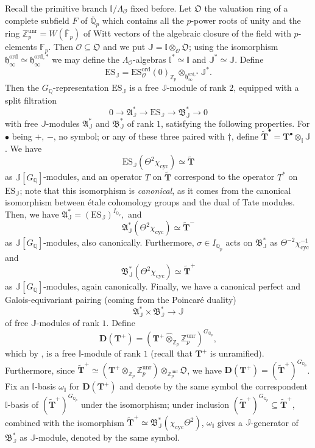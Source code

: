 \documentclass[a4paper,11pt]{amsart}
\numberwithin{equation}{section}
\theoremstyle{plain}
\theoremstyle{definition}
\theoremstyle{remark}
\newcommand{\Q}{\mathbb Q}
\newcommand{\Z}{\mathbb Z}
\newcommand{\F}{\mathbb F}
\newcommand{\I}{\mathbb{I}}
\newcommand{\J}{\mathbb{J}}
\newcommand{\cyc}{{\mathrm{cyc}}}
\newcommand{\ord}{\mathrm{ord}}
\newcommand{\unr}{\mathrm{unr}}
\newcommand{\ES}{\mathrm{ES}}
\begin{document}
Recall the primitive branch $\I/\Lambda_\mathcal{O}$ fixed before. Let $\mathfrak{O}$ the valuation ring of a complete subfield $F$ of $\overline{\Q}_p$ which contains all the $p$-power roots of unity and the ring $\Z_p^\unr=W(\overline{\F}_p)$ of Witt vectors of the algebraic closure of the field with $p$-elements $\F_p$. Then $\mathcal{O}\subseteq\mathfrak{O}$ and we put 
$\mathbb{J}=\mathbb{I}\otimes_{\mathcal{O}}\mathfrak{O}$; 
using the isomorphism $\mathfrak{h}_\infty^\ord\simeq\mathfrak{h}_\infty^{\ord,*}$ we may define the $\Lambda_\mathcal{O}$-algebras $\I^*\simeq\I$ and $\J^*\simeq\J$.  
Define \[\ES_\J=\ES^\ord_{\mathcal{O}}(0)_{\Z_p}\otimes_{\mathfrak{h}_\infty^{\ord,*}}\mathbb{J}^*.\] Then the $G_\Q$-representation $\ES_\J$ is a free $\J$-module of rank $2$, equipped with a split filtration 
\[0\longrightarrow \mathfrak{A}_\J^*\longrightarrow\ES_\J\longrightarrow \mathfrak{B}_\J^*\longrightarrow 0\]
with free $\J$-modules $\mathfrak{A}_\J^*$ and $\mathfrak{B}_\J^*$ of rank $1$, satisfying the following properties. For $\bullet$ being $+$, $-$, no symbol; or any of these three paired with $\dagger$,
define $\widetilde{\mathbf{T}}^\bullet=\mathbf{T}^\bullet\otimes_\I\J$. We have 
\[\ES_\J(\Theta^2\chi_\cyc)\simeq\widetilde{\mathbf{T}}\] as $\J[G_\Q]$-modules,
and an operator $T$ on $\widetilde{\mathbf{T}}$ correspond to the operator $T^*$ on $\ES_\J$; note that this isomorphism is \emph{canonical}, as it 
comes from the canonical isomorphism between \'etale cohomology groups and the dual of Tate modules. 
Then, we have 
$\mathfrak{A}_\J^*=(\ES_\J)^{I_{\Q_p}},$ and  
\[\mathfrak{A}_\J^*(\Theta^2\chi_\cyc)\simeq \widetilde{\mathbf{T}}^-\] 
as $\J[G_\Q]$-modules, also canonically. 
Furthermore, $\sigma\in I_{\Q_p}$ acts on $\mathfrak{B}_{\J}^{*}$ as $\Theta^{-2}\chi_\cyc^{-1}$ and  
\[\mathfrak{B}_\J^*(\Theta^2\chi_\cyc)\simeq  \widetilde{\mathbf{T}}^+\] as $\J[G_\Q]$-modules, again canonically. Finally, we have a canonical perfect and Galois-equivariant pairing (coming from the Poincaré duality) 
\[\mathfrak{A}^*_\J\times \mathfrak{B}_\J^*\longrightarrow \J\]
of free $\J$-modules of rank $1$. Define \[\mathbf{D}(\mathbf{T}^+)=(\mathbf{T}^+\widehat{\otimes}_{\Z_p}\Z_p^\unr)^{G_{\Q_p}},\] which 
by \cite[Lemma 3.3]{Ochiai-Coleman}, is a free $\I$-module of rank $1$ (recall that $\mathbf{T}^+$ is unramified). Furthermore, since $\widetilde{\mathbf{T}}^+\simeq (\mathbf{T}^+\otimes_{\Z_p}\Z_p^\unr)\otimes_{\Z_p^\unr}\mathfrak{O}$, we have $\mathbf{D}(\mathbf{T}^+)=(\widetilde{\mathbf{T}}^+)^{G_{\Q_p}}$. Fix an $\I$-basis $\omega_\I$ for $\mathbf{D}(\mathbf{T}^+)$ and denote by the same symbol the correspondent $\I$-basis of $(\widetilde{\mathbf{T}}^+)^{G_{\Q_p}}$ under the isomorphism; under inclusion $(\widetilde{\mathbf{T}}^+)^{G_{\Q_p}}\subseteq \widetilde{\mathbf{T}}^+$, combined with the isomorphism $\widetilde{\mathbf{T}}^+\simeq\mathfrak{B}_\J^*(\chi_\cyc\Theta^2)$, $\omega_\I$ gives 
a $\J$-generator of $\mathfrak{B}_\J^*$ as $\J$-module, denoted by the same symbol.
\end{document}
